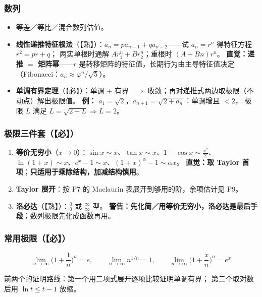 \subsubsection{数列}

\begin{itemize}
  \item 等差／等比／混合数列估值。
  \item \textbf{线性递推特征根法}（【熟】）：$a_n=pa_{n-1}+qa_{n-2}$——试 $a_n=r^n$ 得特征方程 $r^2=pr+q$；
        两实单根时通解 $Ar_1^n+Br_2^n$；重根时 $(A+Bn)r^n$。
        \textbf{直觉：递推 $=$ 矩阵幂}——$r$ 是转移矩阵的特征值，长期行为由主导特征值决定
        （Fibonacci：$a_n\approx\varphi^n/\sqrt5$）。
  \item \textbf{单调有界定理}（【必】）：单调 $+$ 有界 $\implies$ 收敛；再对递推式两边取极限（不动点）解出极限值。
        \textbf{例：} $a_1=\sqrt2$，$a_{n+1}=\sqrt{2+a_n}$：单调增且 $<2$，
        极限 $L$ 满足 $L=\sqrt{2+L}\Rightarrow L=2$。
\end{itemize}

\subsubsection{极限三件套（【必】）}

\begin{enumerate}
  \item \textbf{等价无穷小}（$x\to0$）：$\sin x\sim x$、$\tan x\sim x$、$1-\cos x\sim\frac{x^2}2$、
        $\ln(1+x)\sim x$、$e^x-1\sim x$、$(1+x)^\alpha-1\sim\alpha x$。
        \textbf{直觉：取 Taylor 首项}；\textbf{只适用于乘除结构，加减结构慎用}。
  \item \textbf{Taylor 展开}：按 P7 的 Maclaurin 表展开到够用的阶，余项估计见 P9。
  \item \textbf{洛必达}（【熟】）：$\frac00$ 或 $\frac\infty\infty$ 型。
        \textbf{警告：先化简／用等价无穷小，洛必达是最后手段}；数列极限先化成函数再用。
\end{enumerate}

\subsubsection{常用极限（【必】）}

\[
\lim_{n\to\infty}\Big(1+\frac1n\Big)^n=e,\qquad
\lim_{n\to\infty}n^{1/n}=1,\qquad
\lim_{n\to\infty}\Big(1+\frac xn\Big)^n=e^x
\]

前两个的证明路线：第一个用二项式展开逐项比较证明单调有界；
第二个取对数后用 $\ln t\le t-1$ 放缩。

